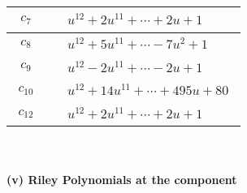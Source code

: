 \documentclass[1p]{elsarticle_modified}
\theoremstyle{definition}
\begin{document}
\begin{tabular}{m{50pt}|m{274pt}}
\hline $$\begin{aligned}c_{7}\end{aligned}$$&$\begin{aligned}
&u^{12}+2 u^{11}+\cdots+2 u+1
\end{aligned}$\\
\hline $$\begin{aligned}c_{8}\end{aligned}$$&$\begin{aligned}
&u^{12}+5 u^{11}+\cdots-7 u^2+1
\end{aligned}$\\
\hline $$\begin{aligned}c_{9}\end{aligned}$$&$\begin{aligned}
&u^{12}-2 u^{11}+\cdots-2 u+1
\end{aligned}$\\
\hline $$\begin{aligned}c_{10}\end{aligned}$$&$\begin{aligned}
&u^{12}+14 u^{11}+\cdots+495 u+80
\end{aligned}$\\
\hline $$\begin{aligned}c_{12}\end{aligned}$$&$\begin{aligned}
&u^{12}+2 u^{11}+\cdots+2 u+1
\end{aligned}$\\
\hline
\end{tabular}\\~\\
\newpage\renewcommand{\arraystretch}{1}
\flushleft \textbf{(v) Riley Polynomials at the component}\newline \\
\end{document}
